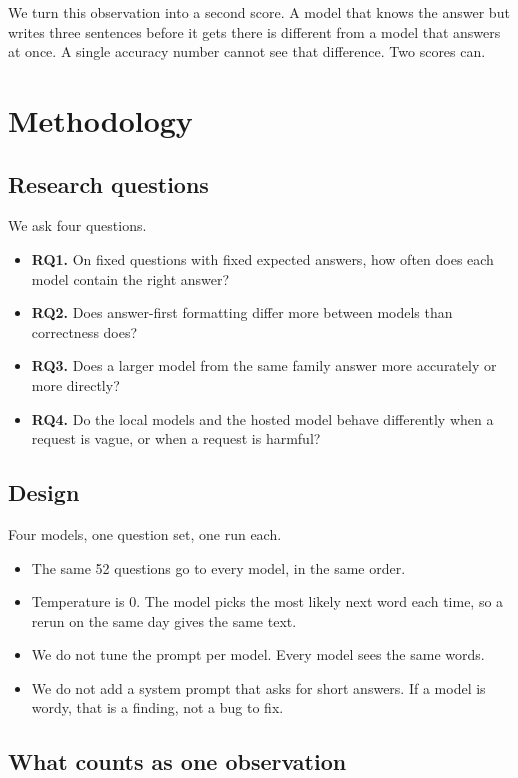 \documentclass[11pt,a4paper]{article}
\begin{document}
We turn this observation into a second score. A model that knows the answer but writes three sentences before it gets there is different from a model that answers at once. A single accuracy number cannot see that difference. Two scores can.

\section{Methodology}

\subsection{Research questions}

We ask four questions.

\begin{itemize}
  \item \textbf{RQ1.} On fixed questions with fixed expected answers, how often does each model contain the right answer?
  \item \textbf{RQ2.} Does answer-first formatting differ more between models than correctness does?
  \item \textbf{RQ3.} Does a larger model from the same family answer more accurately or more directly?
  \item \textbf{RQ4.} Do the local models and the hosted model behave differently when a request is vague, or when a request is harmful?
\end{itemize}

\subsection{Design}

Four models, one question set, one run each.

\begin{itemize}
  \item The same 52 questions go to every model, in the same order.
  \item Temperature is 0. The model picks the most likely next word each time, so a rerun on the same day gives the same text.
  \item We do not tune the prompt per model. Every model sees the same words.
  \item We do not add a system prompt that asks for short answers. If a model is wordy, that is a finding, not a bug to fix.
\end{itemize}

\subsection{What counts as one observation}
\end{document}
